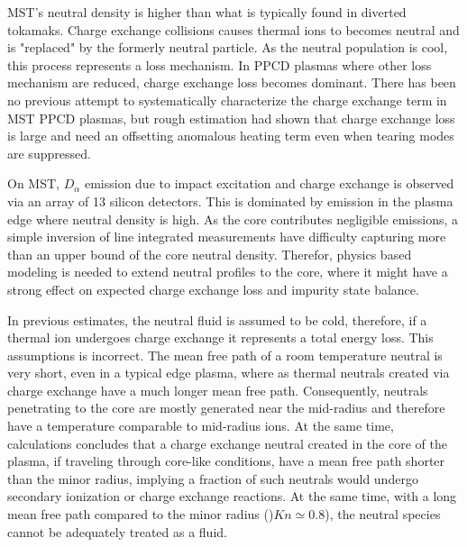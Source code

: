 \documentclass[aip, pop, preprint]{revtex4-1}
\begin{document}
MST's neutral density is higher than what is typically found in diverted
tokamaks. Charge exchange collisions causes thermal ions to becomes neutral and
is "replaced" by the formerly neutral particle. As the neutral population is
cool, this process represents a loss mechanism. In PPCD plasmas where other
loss mechanism are reduced, charge exchange loss becomes dominant. There has
been no previous attempt to systematically characterize the charge exchange
term in MST PPCD plasmas, but rough estimation had shown that charge exchange
loss is large and need an offsetting anomalous heating term even when tearing
modes are suppressed\cite{BiewerThesis}.

On MST, $D_{\alpha}$ emission due to impact excitation and charge exchange is
observed via an array of 13 silicon detectors. This is dominated by emission in
the plasma edge where neutral density is high. As the core contributes
negligible emissions, a simple inversion of line integrated measurements have
difficulty capturing more than an upper bound of the core neutral density.
Therefor, physics based modeling is needed to extend neutral profiles to the
core, where it might have a strong effect on expected charge exchange loss and
impurity state balance.

In previous estimates, the neutral fluid is assumed to be cold, therefore, if a
thermal ion undergoes charge exchange it represents a total energy loss. This
assumptions is incorrect. The mean free path of a room temperature neutral is
very short, even in a typical edge plasma, where as thermal neutrals created
via charge exchange have a much longer mean free path. Consequently, neutrals
penetrating to the core are mostly generated near the mid-radius and therefore
have a temperature comparable to mid-radius ions. At the same time,
calculations concludes that a charge exchange neutral created in the core of
the plasma, if traveling through core-like conditions, have a mean free path
shorter than the minor radius, implying a fraction of such neutrals would
undergo secondary ionization or charge exchange reactions.  At the same time,
with a long mean free path compared to the minor radius ()$Kn \simeq 0.8$), the
neutral species cannot be adequately treated as a fluid. 
\end{document}

